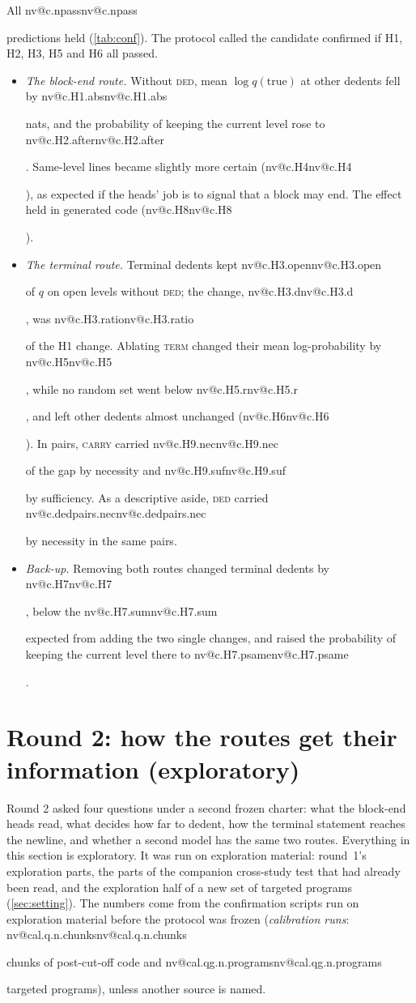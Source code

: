 \documentclass[11pt]{article}
\makeatletter
\newcommand{\nv}[1]{\ifcsname nv@#1\endcsname\csname nv@#1\endcsname\else\PackageError{numbers}{Unknown number key #1}{}\fi}
\newcommand{\ded}{\textsc{ded}}
\newcommand{\term}{\textsc{term}}
\newcommand{\carry}{\textsc{carry}}
\makeatother
\begin{document}
All \nv{c.npass} predictions held (\cref{tab:conf}). The protocol called the candidate confirmed if H1, H2, H3, H5 and H6 all passed.
\begin{itemize}
\item \emph{The block-end route.} Without \ded{}, mean $\log q(\text{true})$ at other dedents fell by \nv{c.H1.abs} nats, and the probability of keeping the current level rose to \nv{c.H2.after}. Same-level lines became slightly more certain (\nv{c.H4}), as expected if the heads' job is to signal that a block may end. The effect held in generated code (\nv{c.H8}).
\item \emph{The terminal route.} Terminal dedents kept \nv{c.H3.open} of $q$ on open levels without \ded{}; the change, \nv{c.H3.d}, was \nv{c.H3.ratio} of the H1 change. Ablating \term{} changed their mean log-probability by \nv{c.H5}, while no random set went below \nv{c.H5.r}, and left other dedents almost unchanged (\nv{c.H6}). In pairs, \carry{} carried \nv{c.H9.nec} of the gap by necessity and \nv{c.H9.suf} by sufficiency. As a descriptive aside, \ded{} carried \nv{c.dedpairs.nec} by necessity in the same pairs.
\item \emph{Back-up.} Removing both routes changed terminal dedents by \nv{c.H7}, below the \nv{c.H7.sum} expected from adding the two single changes, and raised the probability of keeping the current level there to \nv{c.H7.psame}.
\end{itemize}

\section{Round 2: how the routes get their information (exploratory)}
\label{sec:r2explore}

Round 2 asked four questions under a second frozen charter: what the block-end heads read, what decides how far to dedent, how the terminal statement reaches the newline, and whether a second model has the same two routes. Everything in this section is exploratory. It was run on exploration material: round~1's exploration parts, the parts of the companion cross-study test that had already been read, and the exploration half of a new set of targeted programs (\cref{sec:setting}). The numbers come from the confirmation scripts run on exploration material before the protocol was frozen (\emph{calibration runs}: \nv{cal.q.n.chunks} chunks of post-cut-off code and \nv{cal.qg.n.programs} targeted programs), unless another source is named.
\end{document}
